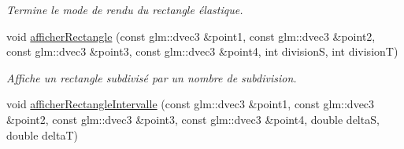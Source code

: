 \begin{DoxyCompactItemize}
\begin{DoxyCompactList}\small\item\em Termine le mode de rendu du rectangle élastique. \end{DoxyCompactList}\item 
void \hyperlink{namespaceaidegl_ab9d35d5387a501181fe379dd596bd25d}{afficher\-Rectangle} (const glm\-::dvec3 \&point1, const glm\-::dvec3 \&point2, const glm\-::dvec3 \&point3, const glm\-::dvec3 \&point4, int division\-S, int division\-T)
\begin{DoxyCompactList}\small\item\em Affiche un rectangle subdivisé par un nombre de subdivision. \end{DoxyCompactList}\item 
\hypertarget{namespaceaidegl_a6775d81c7b7b695dcfb3f3d50cc253a5}{void \hyperlink{namespaceaidegl_a6775d81c7b7b695dcfb3f3d50cc253a5}{afficher\-Rectangle\-Intervalle} (const glm\-::dvec3 \&point1, const glm\-::dvec3 \&point2, const glm\-::dvec3 \&point3, const glm\-::dvec3 \&point4, double delta\-S, double delta\-T)}\label{namespaceaidegl_a6775d81c7b7b695dcfb3f3d50cc253a5}


\end{DoxyCompactItemize}
